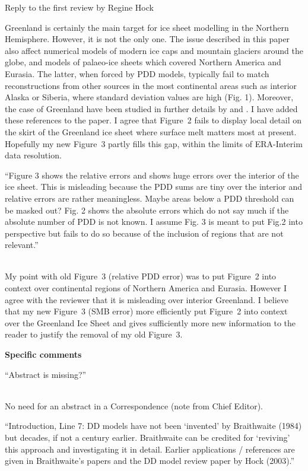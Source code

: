 \documentclass{letter}
\newcommand{\rev}[0]{\color{blue!50!black}\it}
\newcommand{\revpoint}[1]{{\rev\item``#1''}\\}
\begin{document}
\begin{letter}{Reply to the first review by Regine Hock}
\begin{enumerate}[resume]
    Greenland is certainly the main target for ice sheet modelling in the Northern Hemisphere. However, it is not the only one. The issue described in this paper also affect numerical models of modern ice caps and mountain glaciers around the globe, and models of palaeo-ice sheets which covered Northern America and Eurasia. The latter, when forced by PDD models, typically fail to match reconstructions from other sources in the most continental areas such as interior Alaska or Siberia, where standard deviation values are high (Fig. 1). Moreover, the case of Greenland have been studied in further details by \citet{fausto-etal-2011} and \citet{rau-rogozhina-2013}. I have added these references to the paper. I agree that Figure~2 fails to display local detail on the skirt of the Greenland ice sheet where surface melt matters most at present. Hopefully my new Figure~3 partly fills this gap, within the limits of ERA-Interim data resolution.

    \revpoint{Figure 3 shows the relative errors and shows huge errors over the interior of the ice sheet. This is misleading because the PDD sums are tiny over the interior and relative errors are rather meaningless. Maybe areas below a PDD threshold can be masked out? Fig. 2 shows the absolute errors which do not say much if the absolute number of PDD is not known. I assume Fig. 3 is meant to put Fig.2 into perspective but fails to do so because of the inclusion of regions that are not relevant.}

    My point with old Figure~3 (relative PDD error) was to put Figure~2 into context over continental regions of Northern America and Eurasia. However I agree with the reviewer that it is misleading over interior Greenland. I believe that my new Figure~3 (SMB error) more efficiently put Figure~2 into context over the Greenland Ice Sheet and gives sufficiently more new information to the reader to justify the removal of my old Figure~3.

\end{enumerate}


\textbf{Specific comments}

\begin{enumerate}[resume]

    \revpoint{Abstract is missing?}

    No need for an abstract in a Correspondence (note from Chief Editor).

    \revpoint{Introduction, Line 7: DD models have not been ‘invented’ by Braithwaite (1984) but decades, if not a century earlier. Braithwaite can be credited for ‘reviving’ this approach and investigating it in detail. Earlier applications / references are given in Braithwaite’s papers and the DD model review paper by Hock (2003).}


\end{enumerate}
\end{letter}
\end{document}
